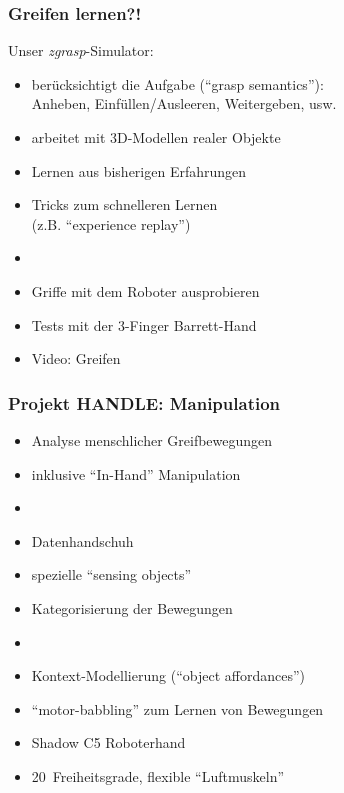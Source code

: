 \documentclass[t]{beamer}
\def\quelle#1{{\tiny \makebox(0,0){}\vfill\hfill #1}}
\begin{document}
\begin{frame}
\frametitle{Greifen lernen?!}
\vspace*{-9mm}
Unser {\em zgrasp}-Simulator:
\begin{itemize}
\item berücksichtigt die Aufgabe ("`grasp semantics"'):\\
      Anheben, Einfüllen/Ausleeren, Weitergeben, usw.
\item arbeitet mit 3D-Modellen realer Objekte
\item Lernen aus bisherigen Erfahrungen 
\item Tricks zum schnelleren Lernen \\
      (z.B. "`experience replay"')
\item[]
\item Griffe mit dem Roboter ausprobieren
\item Tests mit der 3-Finger Barrett-Hand
\item Video: Greifen
\end{itemize}
\end{frame}


\begin{frame}
\frametitle{Projekt HANDLE: Manipulation}
\vspace*{-8mm}%
\begin{itemize}
\item Analyse menschlicher Greifbewegungen
\item inklusive "`In-Hand"' Manipulation
\item[]
\item Datenhandschuh
\item spezielle "`sensing objects"'
\item Kategorisierung der Bewegungen
\item[]
\item Kontext-Modellierung ("`object affordances"')
\item "`motor-babbling"' zum Lernen von Bewegungen
\item Shadow C5 Roboterhand 
\item 20~Freiheitsgrade, flexible "`Luftmuskeln"'
\end{itemize}
\end{frame}
\end{document}
